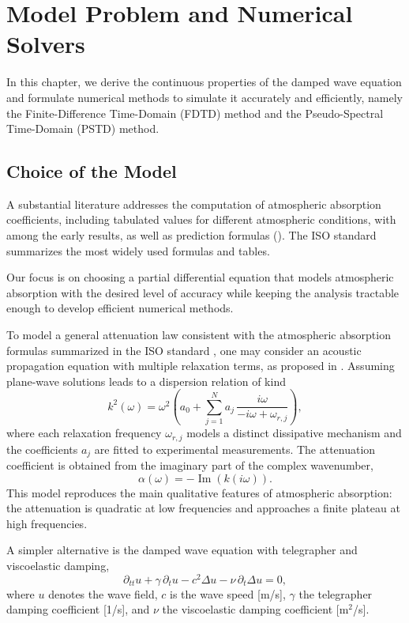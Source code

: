 \documentclass{Configuration_Files/PoliMi3i_thesis}
\begin{document}
\setcounter{secnumdepth}{2}
\chapter{Model Problem and Numerical Solvers}

In this chapter, we derive the continuous properties of the damped wave equation and formulate numerical methods to simulate it accurately and efficiently, namely the Finite-Difference Time-Domain (FDTD) method and the Pseudo-Spectral Time-Domain (PSTD) method.

\section{Choice of the Model}

A substantial literature addresses the computation of atmospheric absorption coefficients, including tabulated values for different atmospheric conditions, with \cite{knudsen_absorption_1933} among the early results, as well as prediction formulas (\cite{bass_atmospheric_1972,evans_atmospheric_1972}). The ISO standard \cite{iso_acoustics_1993} summarizes the most widely used formulas and tables.

Our focus is on choosing a partial differential equation that models atmospheric absorption with the desired level of accuracy while keeping the analysis tractable enough to develop efficient numerical methods.

To model a general attenuation law consistent with the atmospheric absorption formulas summarized in the ISO standard \cite{iso_acoustics_1993}, one may consider an acoustic propagation equation with multiple relaxation terms, as proposed in \cite{nachman_equation_1990}. Assuming plane-wave solutions leads to a dispersion relation of kind
\begin{equation*}
k^2(\omega)
=
\omega^2\left(
a_0+
\sum_{j=1}^{N}
a_j\,
\frac{i\omega}{-i\omega+\omega_{r,j}}
\right),
\end{equation*}
where each relaxation frequency $\omega_{r,j}$ models a distinct dissipative mechanism and the coefficients $a_j$ are fitted to experimental measurements. The attenuation coefficient is obtained from the imaginary part of the complex wavenumber,
\[
\alpha(\omega)=-\operatorname{Im}(k(i\omega)).
\]
This model reproduces the main qualitative features of atmospheric absorption: the attenuation is quadratic at low frequencies and approaches a finite plateau at high frequencies.

A simpler alternative is the damped wave equation with telegrapher and viscoelastic damping,
\begin{equation*}
\partial_{tt}u
+\gamma\,\partial_tu
-c^2\Delta u
-\nu\,\partial_t\Delta u
=0,
\end{equation*}
where $u$ denotes the wave field, $c$ is the wave speed [m/s], $\gamma$ the telegrapher damping coefficient [1/s], and $\nu$ the viscoelastic damping coefficient [m$^2$/s].
\end{document}
